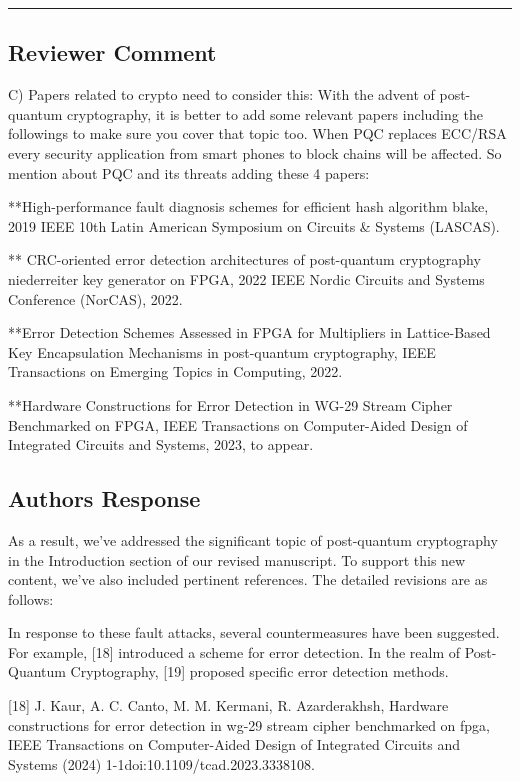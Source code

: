 \noindent\rule{\linewidth}{2.0pt}

\subsection{Reviewer Comment}
C) Papers related to crypto need to consider this: With the advent of post-quantum cryptography, it is better to add some relevant papers including the followings to make sure you cover that topic too. When PQC replaces ECC/RSA every security application from smart phones to block chains will be affected. So mention about PQC and its threats adding these 4 papers:

**High-performance fault diagnosis schemes for efficient hash algorithm blake, 2019 IEEE 10th Latin American Symposium on Circuits \& Systems (LASCAS).

** CRC-oriented error detection architectures of post-quantum cryptography niederreiter key generator on FPGA, 2022 IEEE Nordic Circuits and Systems Conference (NorCAS), 2022.

**Error Detection Schemes Assessed in FPGA for Multipliers in Lattice-Based Key Encapsulation Mechanisms in post-quantum cryptography, IEEE Transactions on Emerging Topics in Computing, 2022.

**Hardware Constructions for Error Detection in WG-29 Stream Cipher Benchmarked on FPGA, IEEE Transactions on Computer-Aided Design of Integrated Circuits and Systems, 2023, to appear.



\subsection{Authors Response}

As a result, we've addressed the significant topic of post-quantum cryptography in the Introduction section of our revised manuscript. To support this new content, we've also included pertinent references. The detailed revisions are as follows:


\color{blue}

In response to these fault attacks, several countermeasures have been suggested. For example, [18] introduced a scheme for error detection. In the realm of Post-Quantum Cryptography, [19] proposed specific error detection methods.

	[18] J. Kaur, A. C. Canto, M. M. Kermani, R. Azarderakhsh, Hardware constructions for error detection in wg-29 stream cipher benchmarked on fpga, IEEE Transactions on Computer-Aided Design of Integrated Circuits and Systems (2024) 1-1doi:10.1109/tcad.2023.3338108.

